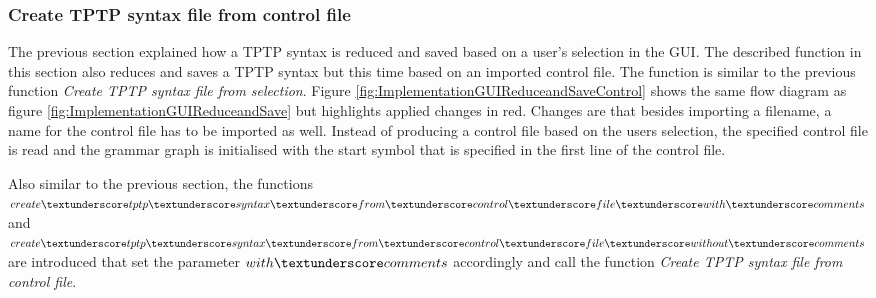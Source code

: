 \subsubsection{Create \ac{TPTP} syntax file from control file}\label{sec:ImplementationGUICreateTPTPFromControlfile}

The previous section explained how a \ac{TPTP} syntax is reduced and saved based on a user's selection in the GUI.
The described function in this section also reduces and saves a \ac{TPTP} syntax but this time based on an imported control file.
The function is similar to the previous function \textit{Create \ac{TPTP} syntax file from selection}.
Figure \ref{fig:ImplementationGUIReduceandSaveControl} shows the same flow diagram as figure \ref{fig:ImplementationGUIReduceandSave} but highlights applied changes in red.
Changes are that besides importing a filename, a name for the control file has to be imported as well.
Instead of producing a control file based on the users selection, the specified control file is read and the grammar graph is initialised with the start symbol that is specified in the first line of the control file.

Also similar to the previous section, the functions \\ $create\textunderscore tptp\textunderscore syntax\textunderscore from\textunderscore control\textunderscore file\textunderscore with\textunderscore comments$ and \\
$create\textunderscore tptp\textunderscore syntax\textunderscore from\textunderscore control\textunderscore file\textunderscore without\textunderscore comments$ are introduced that set the parameter $with\textunderscore comments$ accordingly and call the function \textit{Create \ac{TPTP} syntax file from control file}.

